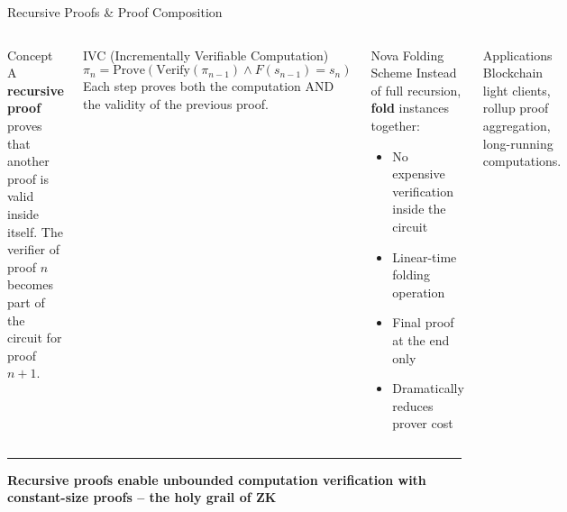 \documentclass[8pt,aspectratio=169]{beamer}
\newcommand{\bottomnote}[1]{\vfill\vspace{-2mm}\textcolor{mllavender2}{\rule{\textwidth}{0.4pt}}\vspace{1mm}\footnotesize\textbf{#1}}
\begin{document}
\begin{frame}{Recursive Proofs \& Proof Composition}
\begin{columns}[T]
\begin{block}{Concept}
\footnotesize
A \textbf{recursive proof} proves that another proof is valid inside itself. The verifier of proof $n$ becomes part of the circuit for proof $n+1$.
\end{block}
\vspace{1mm}

\begin{block}{IVC (Incrementally Verifiable Computation)}
\footnotesize
\[
\pi_n = \text{Prove}(\text{Verify}(\pi_{n-1}) \wedge F(s_{n-1}) = s_n)
\]
Each step proves both the computation AND the validity of the previous proof.
\end{block}
\vspace{2mm}
\begin{block}{Nova Folding Scheme}
\footnotesize
Instead of full recursion, \textbf{fold} instances together:
\begin{itemize}
  \item No expensive verification inside the circuit
  \item Linear-time folding operation
  \item Final proof at the end only
  \item Dramatically reduces prover cost
\end{itemize}
\end{block}
\vspace{2mm}
\begin{exampleblock}{\footnotesize Applications}
\footnotesize
Blockchain light clients, rollup proof aggregation, long-running computations.
\end{exampleblock}
\end{columns}
\bottomnote{Recursive proofs enable unbounded computation verification with constant-size proofs -- the holy grail of ZK}
\end{frame}
\end{document}
